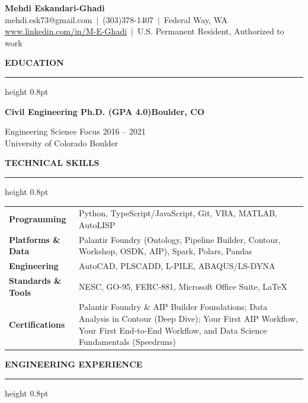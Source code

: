 \documentclass[10pt, letterpaper]{article}
\newcommand{\rsection}[1]{%
  \vspace{8pt}%
  {\large\bfseries\MakeUppercase{#1}}%
  \vspace{1pt}%
  \hrule height 0.8pt%
  \vspace{4pt}%
}
\newcommand{\jobline}[2]{%
  \vspace{5pt}%
  \noindent\textbf{#1}\hfill\textbf{#2}\par%
  \vspace{1pt}%
}
\begin{document}
\pagestyle{empty}

\begin{center}
  {\LARGE\bfseries Mehdi Eskandari-Ghadi}\\[4pt]
  mehdi.esk73@gmail.com\ $|$\ (303)378-1407\ $|$\ Federal Way, WA\\[2pt]
  \href{http://www.linkedin.com/in/M-E-Ghadi}{www.linkedin.com/in/M-E-Ghadi}\ $|$\
  U.S. Permanent Resident, Authorized to work
\end{center}

\vspace{2pt}

\rsection{Education}

\jobline{Civil Engineering Ph.D. (GPA 4.0)}{Boulder, CO}
Engineering Science Focus \hfill 2016 -- 2021\\
University of Colorado Boulder

\rsection{Technical Skills}

\vspace{2pt}
\begin{tabular}{@{}p{3.4cm}p{14.4cm}@{}}
  \textbf{Programming}       & Python, TypeScript/JavaScript, Git, VBA, MATLAB, AutoLISP \\[2pt]
  \textbf{Platforms \& Data} & Palantir Foundry (Ontology, Pipeline Builder, Contour, Workshop, OSDK, AIP), Spark, Polars, Pandas \\[2pt]
  \textbf{Engineering}       & AutoCAD, PLSCADD, L-PILE, ABAQUS/LS-DYNA \\[2pt]
  \textbf{Standards \& Tools} & NESC, GO-95, FERC-881, Microsoft Office Suite, LaTeX \\[2pt]
  \textbf{Certifications}    & Palantir Foundry \& AIP Builder Foundations; Data Analysis in Contour (Deep Dive); Your First AIP Workflow, Your First End-to-End Workflow, and Data Science Fundamentals (Speedruns) \\
\end{tabular}

\rsection{Engineering Experience}
\end{document}
